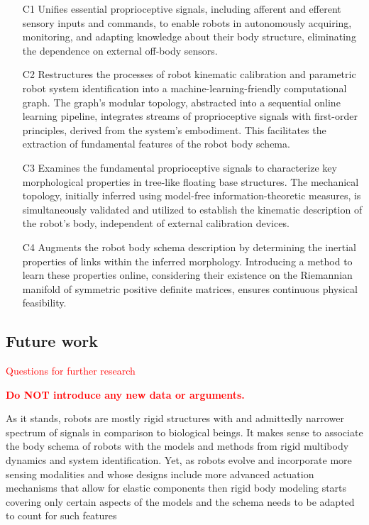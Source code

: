 \documentclass[12pt, a4paper]{article}
\newcommand{\redtext}[1]{\textcolor{red}{#1}}
\begin{document}
\begin{itemize}
\item[C1] Unifies essential proprioceptive signals, including afferent and efferent sensory inputs and commands, to enable robots in autonomously acquiring, monitoring, and adapting knowledge about their body structure, eliminating the dependence on external off-body sensors.
\item[C2] Restructures the processes of robot kinematic calibration and parametric robot system identification into a machine-learning-friendly computational graph. The graph's modular topology, abstracted into a sequential online learning pipeline, integrates streams of proprioceptive signals with first-order principles, derived from the system's embodiment. This facilitates the extraction of fundamental features of the robot body schema.
\item[C3]  Examines the fundamental proprioceptive signals to characterize key morphological properties in tree-like floating base structures. The mechanical topology, initially inferred using model-free information-theoretic measures, is simultaneously validated and utilized to establish the kinematic description of the robot's body, independent of external calibration devices.
\item[C4] Augments the robot body schema description by determining the inertial properties of links within the inferred morphology. Introducing a method to learn these properties online, considering their existence on the Riemannian manifold of symmetric positive definite matrices, ensures continuous physical feasibility.
\end{itemize}


\subsection*{Future work}
\redtext{Questions for further research}

\redtext{\textbf{Do NOT introduce any new data or arguments.}}

As it stands, robots are mostly rigid structures with and admittedly narrower spectrum of signals in comparison to biological beings. It makes sense to associate the body schema of robots with the models and methods from rigid multibody dynamics and system identification. Yet, as robots evolve and incorporate more sensing modalities and whose designs include more advanced actuation mechanisms that allow for elastic components then rigid body modeling starts covering only certain aspects of the models and the schema needs to be adapted to count for such features
\end{document}
